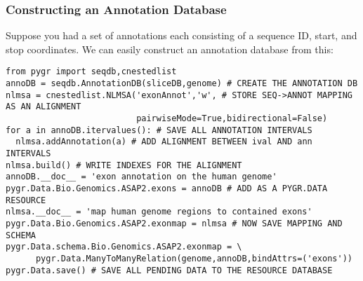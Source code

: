 \documentclass{howto}
\begin{document}
\subsubsection{Constructing an Annotation Database}
Suppose you had a set of annotations  each consisting of a sequence ID,
start, and stop coordinates.  We can easily construct an annotation database
from this:
\begin{verbatim}
from pygr import seqdb,cnestedlist
annoDB = seqdb.AnnotationDB(sliceDB,genome) # CREATE THE ANNOTATION DB
nlmsa = cnestedlist.NLMSA('exonAnnot','w', # STORE SEQ->ANNOT MAPPING AS AN ALIGNMENT
                          pairwiseMode=True,bidirectional=False)
for a in annoDB.itervalues(): # SAVE ALL ANNOTATION INTERVALS
  nlmsa.addAnnotation(a) # ADD ALIGNMENT BETWEEN ival AND ann INTERVALS
nlmsa.build() # WRITE INDEXES FOR THE ALIGNMENT
annoDB.__doc__ = 'exon annotation on the human genome'
pygr.Data.Bio.Genomics.ASAP2.exons = annoDB # ADD AS A PYGR.DATA RESOURCE
nlmsa.__doc__ = 'map human genome regions to contained exons'
pygr.Data.Bio.Genomics.ASAP2.exonmap = nlmsa # NOW SAVE MAPPING AND SCHEMA
pygr.Data.schema.Bio.Genomics.ASAP2.exonmap = \
      pygr.Data.ManyToManyRelation(genome,annoDB,bindAttrs=('exons'))
pygr.Data.save() # SAVE ALL PENDING DATA TO THE RESOURCE DATABASE
\end{verbatim}
\end{document}
